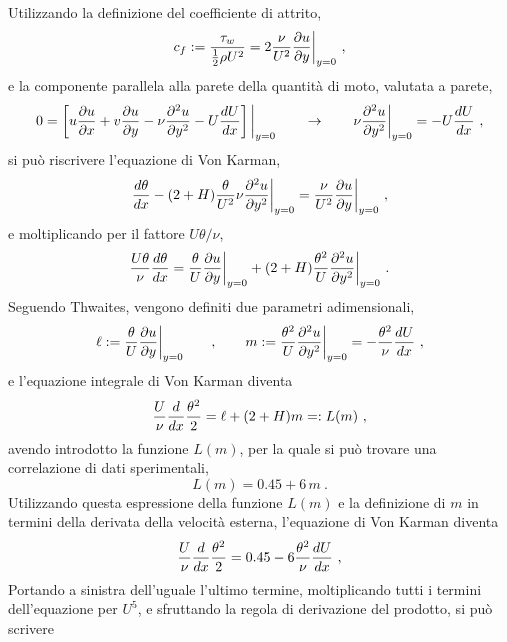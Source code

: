 \vspace{10cm}

Utilizzando la definizione del coefficiente di attrito,
\begin{equation}
 c_f := \dfrac{\tau_w}{\frac{1}{2}\rho U^2} = 2 \dfrac{\nu}{U^2} \dfrac{\partial{u}}{\partial{y}}\bigg|_{y=0} \ ,
\end{equation}
e la componente parallela alla parete della quantità di moto, valutata a parete,
\begin{equation}
0 = \left[ u\dfrac{\partial{u}}{\partial{x}} + v\dfrac{\partial{u}}{\partial{y}} - \nu \dfrac{\partial^2 u}{\partial y^2} - U \frac{dU}{dx}\right]\bigg|_{y=0} \qquad \rightarrow \qquad \nu \dfrac{\partial^2 u}{\partial y^2}\bigg|_{y=0} = - U \frac{dU}{dx}  \ ,
\end{equation}
si può riscrivere l'equazione di Von Karman,
\begin{equation}
 \frac{d\theta}{dx} - (2+H) \frac{\theta}{U^2} \nu \dfrac{\partial^2 u}{\partial y^2}\bigg|_{y=0} =
 \dfrac{\nu}{U^2} \dfrac{\partial{u}}{\partial{y}}\bigg|_{y=0} \ ,
\end{equation}
e moltiplicando per il fattore $U \theta / \nu$,
\begin{equation}
 \frac{U \theta}{\nu} \frac{d\theta}{dx} =
 \frac{\theta}{U}\dfrac{\partial{u}}{\partial{y}}\bigg|_{y=0} + (2+H) \frac{\theta^2}{U} \dfrac{\partial^2 u}{\partial y^2}\bigg|_{y=0} \ .
\end{equation}
Seguendo Thwaites, vengono definiti due parametri adimensionali,
\begin{equation}
 \ell := \frac{\theta}{U}\dfrac{\partial{u}}{\partial{y}}\bigg|_{y=0} 
 \qquad , \qquad
    m := \frac{\theta^2}{U} \dfrac{\partial^2 u}{\partial y^2}\bigg|_{y=0}
       = - \dfrac{\theta^2}{\nu}\dfrac{dU}{dx} \ ,
\end{equation}
e l'equazione integrale di Von Karman diventa
\begin{equation}
 \frac{U}{\nu} \frac{d}{dx}\frac{\theta^2}{2} = \ell + ( 2 + H ) m =: L(m) \ ,
\end{equation}
avendo introdotto la funzione $L(m)$, per la quale si può trovare una correlazione di dati sperimentali,
\begin{equation}
 L(m) = 0.45 + 6 \, m  \ .
\end{equation}
Utilizzando questa espressione della funzione $L(m)$ e la definizione di $m$ in termini della derivata della velocità esterna, l'equazione di Von Karman diventa
\begin{equation}
 \f{U}{\nu} \f{d}{dx}\f{\theta^2}{2} = 0.45 - 6 \f{\theta^2}{\nu}\f{dU}{dx} \ ,
\end{equation}
Portando a sinistra dell'uguale l'ultimo termine, moltiplicando tutti i termini dell'equazione per $U^5$, e sfruttando la regola di derivazione del prodotto, si può scrivere
